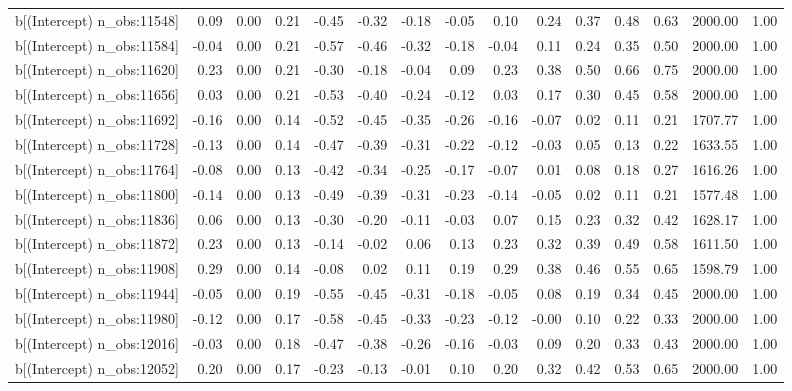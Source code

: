 \begin{table}[ht]
\begin{tabular}{rrrrrrrrrrrrrrr}
  b[(Intercept) n\_obs:11548] & 0.09 & 0.00 & 0.21 & -0.45 & -0.32 & -0.18 & -0.05 & 0.10 & 0.24 & 0.37 & 0.48 & 0.63 & 2000.00 & 1.00 \\ 
  b[(Intercept) n\_obs:11584] & -0.04 & 0.00 & 0.21 & -0.57 & -0.46 & -0.32 & -0.18 & -0.04 & 0.11 & 0.24 & 0.35 & 0.50 & 2000.00 & 1.00 \\ 
  b[(Intercept) n\_obs:11620] & 0.23 & 0.00 & 0.21 & -0.30 & -0.18 & -0.04 & 0.09 & 0.23 & 0.38 & 0.50 & 0.66 & 0.75 & 2000.00 & 1.00 \\ 
  b[(Intercept) n\_obs:11656] & 0.03 & 0.00 & 0.21 & -0.53 & -0.40 & -0.24 & -0.12 & 0.03 & 0.17 & 0.30 & 0.45 & 0.58 & 2000.00 & 1.00 \\ 
  b[(Intercept) n\_obs:11692] & -0.16 & 0.00 & 0.14 & -0.52 & -0.45 & -0.35 & -0.26 & -0.16 & -0.07 & 0.02 & 0.11 & 0.21 & 1707.77 & 1.00 \\ 
  b[(Intercept) n\_obs:11728] & -0.13 & 0.00 & 0.14 & -0.47 & -0.39 & -0.31 & -0.22 & -0.12 & -0.03 & 0.05 & 0.13 & 0.22 & 1633.55 & 1.00 \\ 
  b[(Intercept) n\_obs:11764] & -0.08 & 0.00 & 0.13 & -0.42 & -0.34 & -0.25 & -0.17 & -0.07 & 0.01 & 0.08 & 0.18 & 0.27 & 1616.26 & 1.00 \\ 
  b[(Intercept) n\_obs:11800] & -0.14 & 0.00 & 0.13 & -0.49 & -0.39 & -0.31 & -0.23 & -0.14 & -0.05 & 0.02 & 0.11 & 0.21 & 1577.48 & 1.00 \\ 
  b[(Intercept) n\_obs:11836] & 0.06 & 0.00 & 0.13 & -0.30 & -0.20 & -0.11 & -0.03 & 0.07 & 0.15 & 0.23 & 0.32 & 0.42 & 1628.17 & 1.00 \\ 
  b[(Intercept) n\_obs:11872] & 0.23 & 0.00 & 0.13 & -0.14 & -0.02 & 0.06 & 0.13 & 0.23 & 0.32 & 0.39 & 0.49 & 0.58 & 1611.50 & 1.00 \\ 
  b[(Intercept) n\_obs:11908] & 0.29 & 0.00 & 0.14 & -0.08 & 0.02 & 0.11 & 0.19 & 0.29 & 0.38 & 0.46 & 0.55 & 0.65 & 1598.79 & 1.00 \\ 
  b[(Intercept) n\_obs:11944] & -0.05 & 0.00 & 0.19 & -0.55 & -0.45 & -0.31 & -0.18 & -0.05 & 0.08 & 0.19 & 0.34 & 0.45 & 2000.00 & 1.00 \\ 
  b[(Intercept) n\_obs:11980] & -0.12 & 0.00 & 0.17 & -0.58 & -0.45 & -0.33 & -0.23 & -0.12 & -0.00 & 0.10 & 0.22 & 0.33 & 2000.00 & 1.00 \\ 
  b[(Intercept) n\_obs:12016] & -0.03 & 0.00 & 0.18 & -0.47 & -0.38 & -0.26 & -0.16 & -0.03 & 0.09 & 0.20 & 0.33 & 0.43 & 2000.00 & 1.00 \\ 
  b[(Intercept) n\_obs:12052] & 0.20 & 0.00 & 0.17 & -0.23 & -0.13 & -0.01 & 0.10 & 0.20 & 0.32 & 0.42 & 0.53 & 0.65 & 2000.00 & 1.00 \\ 

\end{tabular}
\end{table}
